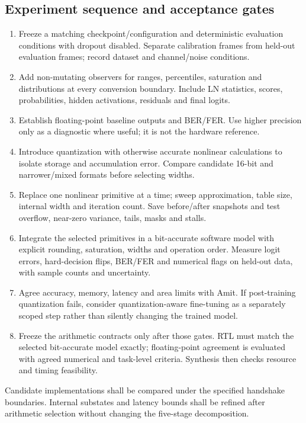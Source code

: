 \documentclass[11pt,a4paper]{article}
\begin{document}
\subsection{Experiment sequence and acceptance gates}
\begin{enumerate}
\item Freeze a matching checkpoint/configuration and deterministic evaluation conditions with dropout disabled. Separate calibration frames from held-out evaluation frames; record dataset and channel/noise conditions.
\item Add non-mutating observers for ranges, percentiles, saturation and distributions at every conversion boundary. Include LN statistics, scores, probabilities, hidden activations, residuals and final logits.
\item Establish floating-point baseline outputs and BER/FER. Use higher precision only as a diagnostic where useful; it is not the hardware reference.
\item Introduce quantization with otherwise accurate nonlinear calculations to isolate storage and accumulation error. Compare candidate 16-bit and narrower/mixed formats before selecting widths.
\item Replace one nonlinear primitive at a time; sweep approximation, table size, internal width and iteration count. Save before/after snapshots and test overflow, near-zero variance, tails, masks and stalls.
\item Integrate the selected primitives in a bit-accurate software model with explicit rounding, saturation, widths and operation order. Measure logit errors, hard-decision flips, BER/FER and numerical flags on held-out data, with sample counts and uncertainty.
\item Agree accuracy, memory, latency and area limits with Amit. If post-training quantization fails, consider quantization-aware fine-tuning as a separately scoped step rather than silently changing the trained model.
\item Freeze the arithmetic contracts only after those gates. RTL must match the selected bit-accurate model exactly; floating-point agreement is evaluated with agreed numerical and task-level criteria. Synthesis then checks resource and timing feasibility.
\end{enumerate}
Candidate implementations shall be compared under the specified handshake boundaries. Internal substates and latency bounds shall be refined after arithmetic selection without changing the five-stage decomposition.
\end{document}
